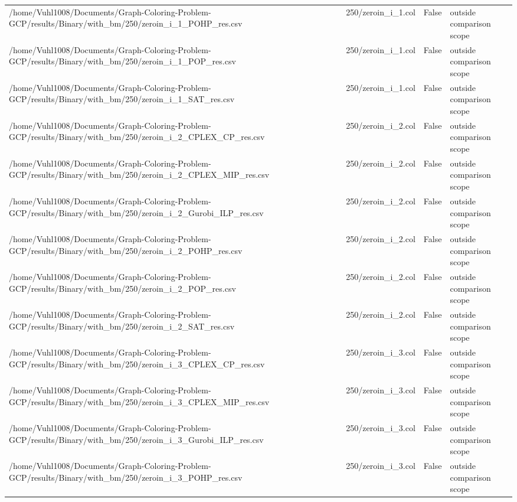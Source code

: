 \begin{table}[htbp]
\begin{tabular}{llll}
/home/Vuhl1008/Documents/Graph-Coloring-Problem-GCP/results/Binary/with\_bm/250/zeroin\_i\_1\_POHP\_res.csv & 250/zeroin\_i\_1.col & False & outside comparison scope \\
/home/Vuhl1008/Documents/Graph-Coloring-Problem-GCP/results/Binary/with\_bm/250/zeroin\_i\_1\_POP\_res.csv & 250/zeroin\_i\_1.col & False & outside comparison scope \\
/home/Vuhl1008/Documents/Graph-Coloring-Problem-GCP/results/Binary/with\_bm/250/zeroin\_i\_1\_SAT\_res.csv & 250/zeroin\_i\_1.col & False & outside comparison scope \\
/home/Vuhl1008/Documents/Graph-Coloring-Problem-GCP/results/Binary/with\_bm/250/zeroin\_i\_2\_CPLEX\_CP\_res.csv & 250/zeroin\_i\_2.col & False & outside comparison scope \\
/home/Vuhl1008/Documents/Graph-Coloring-Problem-GCP/results/Binary/with\_bm/250/zeroin\_i\_2\_CPLEX\_MIP\_res.csv & 250/zeroin\_i\_2.col & False & outside comparison scope \\
/home/Vuhl1008/Documents/Graph-Coloring-Problem-GCP/results/Binary/with\_bm/250/zeroin\_i\_2\_Gurobi\_ILP\_res.csv & 250/zeroin\_i\_2.col & False & outside comparison scope \\
/home/Vuhl1008/Documents/Graph-Coloring-Problem-GCP/results/Binary/with\_bm/250/zeroin\_i\_2\_POHP\_res.csv & 250/zeroin\_i\_2.col & False & outside comparison scope \\
/home/Vuhl1008/Documents/Graph-Coloring-Problem-GCP/results/Binary/with\_bm/250/zeroin\_i\_2\_POP\_res.csv & 250/zeroin\_i\_2.col & False & outside comparison scope \\
/home/Vuhl1008/Documents/Graph-Coloring-Problem-GCP/results/Binary/with\_bm/250/zeroin\_i\_2\_SAT\_res.csv & 250/zeroin\_i\_2.col & False & outside comparison scope \\
/home/Vuhl1008/Documents/Graph-Coloring-Problem-GCP/results/Binary/with\_bm/250/zeroin\_i\_3\_CPLEX\_CP\_res.csv & 250/zeroin\_i\_3.col & False & outside comparison scope \\
/home/Vuhl1008/Documents/Graph-Coloring-Problem-GCP/results/Binary/with\_bm/250/zeroin\_i\_3\_CPLEX\_MIP\_res.csv & 250/zeroin\_i\_3.col & False & outside comparison scope \\
/home/Vuhl1008/Documents/Graph-Coloring-Problem-GCP/results/Binary/with\_bm/250/zeroin\_i\_3\_Gurobi\_ILP\_res.csv & 250/zeroin\_i\_3.col & False & outside comparison scope \\
/home/Vuhl1008/Documents/Graph-Coloring-Problem-GCP/results/Binary/with\_bm/250/zeroin\_i\_3\_POHP\_res.csv & 250/zeroin\_i\_3.col & False & outside comparison scope \\

\end{tabular}
\end{table}
